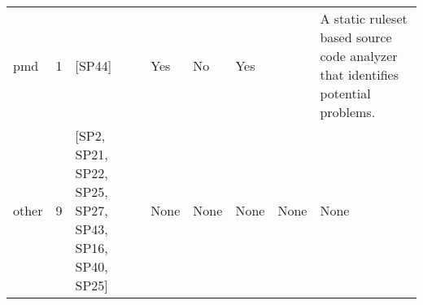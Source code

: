 \begin{tabular}{lrllllll}
                 pmd &      1 &                                                 [SP44] &   Yes &       No &       Yes &                                                                                                                                                                                         &                                                                                                                                                                                                                                                                                                                                  A static ruleset based source code analyzer that identifies potential problems. \\
               other &      9 &  [SP2, SP21, SP22, SP25, SP27, SP43, SP16, SP40, SP25] &  None &     None &      None &                                                                                                                                                                                    None &                                                                                                                                                                                                                                                                                                                                                                                                             None \\
\bottomrule
\end{tabular}
